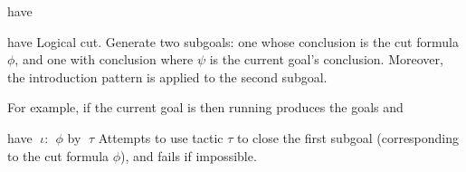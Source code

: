 \begin{tactic}{have}
  \begin{tsyntax}[empty]{have}
    Logical cut. Generate two subgoals: one whose conclusion is the
    cut formula $\phi$, and one with conclusion \ec{$\phi$ =>
      $\;\psi$} where $\psi$ is the current goal's
    conclusion. Moreover, the introduction pattern \ec{$\iota$} is
    applied to the second subgoal.

  For example, if the current goal is
   then
  running 
  produces the goals
  and
  \end{tsyntax}

  \begin{tsyntax}{have $\;\iota$: $\;\phi$ by $\;\tau$}
  Attempts to use tactic $\tau$ to close the first subgoal (corresponding to
  the cut formula $\phi$), and fails if impossible.
  \end{tsyntax}
\end{tactic}

